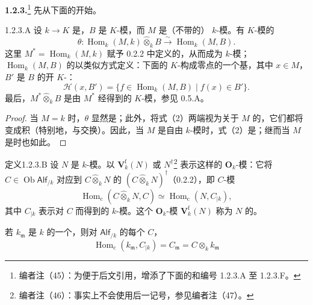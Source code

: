 \textbf{1.2.3.}\footnote{编者注（45）：为便于后文引用，增添了下面的和编号 1.2.3.A 至 1.2.3.F。} 先从下面的开始。
\begin{SGAresult}{}{1.2.3.A}
设 $k\to K$ 是，$B$ 是 $K$-模，而 $M$ 是（不带的） $k$-模。有 $K$-模的
\[
 \theta:\operatorname{Hom}_k(M,k)\widehat\otimes_k B\xrightarrow{\sim}\operatorname{Hom}_k(M,B).\tag{2}
\]
这里 $M^*=\operatorname{Hom}_k(M,k)$ 赋予 0.2.2 中定义的，从而成为 $k$-模；$\operatorname{Hom}_k(M,B)$ 的以类似方式定义：下面的 $K$-构成零点的一个基，其中 $x\in M$，$B'$ 是 $B$ 的开 $K$-：
\[
 \mathscr H(x,B')=\{f\in\operatorname{Hom}_k(M,B)\mid f(x)\in B'\}.
\]
最后，$M^*\widehat\otimes_k B$ 是由 $M^*$ 经得到的 $K$-模，参见 0.5.A。
\end{SGAresult}
\begin{proof}
当 $M=k$ 时，$\theta$ 显然是；此外，将式（2）两端视为关于 $M$ 的，它们都将变成积（特别地，与交换）。因此，当 $M$ 是自由 $k$-模时，式（2）是；继而当 $M$ 是时也如此。
\end{proof}
\begin{SGAresult}{定义}{1.2.3.B}
设 $N$ 是 $k$-模。以 $\mathbf V_k^{\mathrm f}(N)$ 或 $N^\dagger$\footnote{编者注（46）：事实上不会使用后一记号，参见编者注（47）。} 表示这样的 $\mathbf O_k$-模：它将 $C\in\operatorname{Ob}\mathsf{Alf}_{/k}$ 对应到 $C\widehat\otimes_k N$ 的 $(C\widehat\otimes_k N)^\dagger$（0.2.2），即 $C$-模
\[
 \operatorname{Hom}_{\mathrm c}(C\widehat\otimes_k N,C)\simeq\operatorname{Hom}_{\mathrm c}(N,C_{|k}),
\]
其中 $C_{|k}$ 表示对 $C$ 而得到的 $k$-模。这个 $\mathbf O_k$-模 $\mathbf V_k^{\mathrm f}(N)$ 称为 $N$ 的。
\end{SGAresult}
若 $k_{\mathfrak m}$ 是 $k$ 的一个，则对 $\mathsf{Alf}_{/k}$ 的每个 $C$，
\[
 \operatorname{Hom}_{\mathrm c}(k_{\mathfrak m},C_{|k})=C_{\mathfrak m}=C\otimes_k k_{\mathfrak m}
\]
